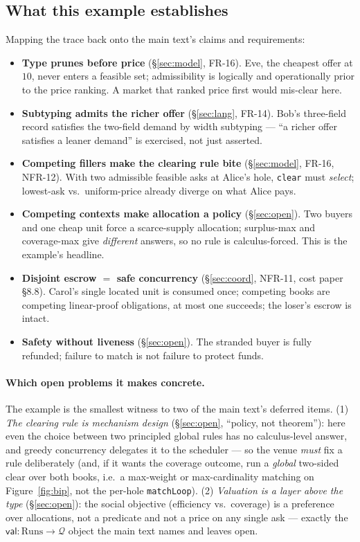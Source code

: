 \documentclass[11pt]{article}
\theoremstyle{definition}
\newcommand{\val}{\ensuremath{\mathsf{val}}}
\newcommand{\Qval}{\mathcal{Q}}            %
\begin{document}
\subsection{What this example establishes}
Mapping the trace back onto the main text's claims and requirements:

\begin{itemize}[leftmargin=1.4em]
\item \textbf{Type prunes before price} (\S\ref{sec:model}, FR-16). Eve, the cheapest offer at $10$, never enters a
feasible set; admissibility is logically and operationally prior to the price ranking. A market that
ranked price first would mis-clear here.
\item \textbf{Subtyping admits the richer offer} (\S\ref{sec:lang}, FR-14). Bob's three-field record satisfies
the two-field demand by width subtyping --- ``a richer offer satisfies a leaner demand'' is exercised,
not just asserted.
\item \textbf{Competing fillers make the clearing rule bite} (\S\ref{sec:model}, FR-16, NFR-12). With two
admissible feasible asks at Alice's hole, \texttt{clear} must \emph{select}; lowest-ask vs.\
uniform-price already diverge on what Alice pays.
\item \textbf{Competing contexts make allocation a policy} (\S\ref{sec:open}). Two buyers and one cheap unit force
a scarce-supply allocation; surplus-max and coverage-max give \emph{different} answers, so no rule is
calculus-forced. This is the example's headline.
\item \textbf{Disjoint escrow $=$ safe concurrency} (\S\ref{sec:coord}, NFR-11, cost paper \S8.8). Carol's single
located unit is consumed once; competing books are competing linear-proof obligations, at most one
succeeds; the loser's escrow is intact.
\item \textbf{Safety without liveness} (\S\ref{sec:open}). The stranded buyer is fully refunded; failure to match
is not failure to protect funds.
\end{itemize}

\paragraph{Which open problems it makes concrete.} The example is the smallest witness to two of the
main text's deferred items. (1) \emph{The clearing rule is mechanism design} (\S\ref{sec:open}, ``policy, not
theorem''): here even the choice between two principled global rules has no calculus-level answer, and
greedy concurrency delegates it to the scheduler --- so the venue \emph{must} fix a rule deliberately
(and, if it wants the coverage outcome, run a \emph{global} two-sided clear over both books, i.e.\ a
max-weight or max-cardinality matching on Figure~\ref{fig:bip}, not the per-hole \texttt{matchLoop}).
(2) \emph{Valuation is a layer above the type} (\S\ref{sec:open}): the social objective (efficiency vs.\ coverage)
is a preference over allocations, not a predicate and not a price on any single ask --- exactly the
$\val:\mathrm{Runs}\to\Qval$ object the main text names and leaves open.
\end{document}
